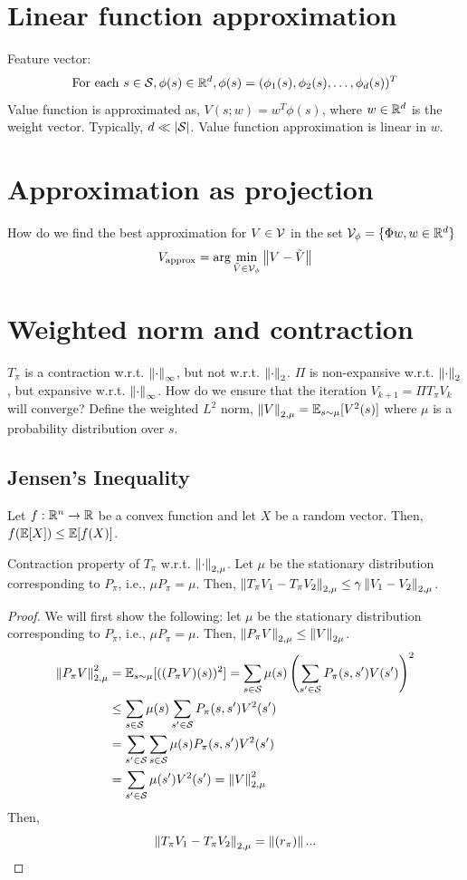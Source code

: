 \documentclass[11pt]{book}
\begin{document}
\section{Linear function approximation}
Feature vector: 
\[
  \text{For each } s \in\mathcal{S}, \phi(s) \in \mathbb{R}^d, \phi(s) = (\phi_1(s), \phi_2(s), \dots, \phi_d(s))^T 
\]
Value function is approximated as, $V(s; w) = w^T \phi(s)$, where $w \in \mathbb{R}^d$ is the weight vector. Typically, $d \ll |\mathcal{S}|$. Value function approximation is linear in $w$.

\section{Approximation as projection}
How do we find the best approximation for $V \in \mathcal{V}$ in the set $\mathcal{V}_\phi = \{\Phi w, w \in \mathbb{R}^d \}$
\[
  V_{\text{approx}} = \arg\min_{\tilde{V}\in\mathcal{V}_\phi} \left\lVert V - \tilde{V} \right\rVert
\] 
\section{Weighted norm and contraction}
$T_\pi$ is a contraction w.r.t. $\left\lVert \cdot \right\rVert_\infty$, but not w.r.t. $\left\lVert \cdot \right\rVert_2$. $\Pi$ is non-expansive w.r.t. $\left\lVert \cdot \right\rVert_2$, but expansive w.r.t. $\left\lVert \cdot \right\rVert_\infty$.
How do we ensure that the iteration $V_{k+1} = \Pi T_\pi V_k$ will converge? Define the weighted $L^2$ norm, $\left\lVert V \right\rVert_{2,\mu} = \mathbb{E}_{s\sim\mu}[V^2(s)]$ where $\mu$ is a probability distribution over $s$.

\subsection{Jensen's Inequality}
Let $f : \mathbb{R}^n \to \mathbb{R}$ be a convex function and let $X$ be a random vector. Then, $f(\mathbb{E}[X]) \leq \mathbb{E}[f(X)]$.

\begin{lemma}
  Contraction property of $T_\pi$ w.r.t. $\left\lVert \cdot \right\rVert_{2,\mu}$. Let $\mu$ be the stationary distribution corresponding to $P_\pi$, i.e., $\mu P_\pi = \mu$. Then, 
  $\left\lVert T_\pi V_1 - T_\pi V_2 \right\rVert_{2, \mu} \leq \gamma \left\lVert V_1 - V_2 \right\rVert_{2, \mu}$.
\end{lemma}

\begin{proof}
  We will first show the following: let $\mu$ be the stationary distribution corresponding to $P_\pi$, i.e., $\mu P_\pi = \mu$. Then, $\left\lVert P_\pi V \right\rVert_{2,\mu} \leq \left\lVert V \right\rVert_{2\mu}$.
  \begin{align*}
    \left\lVert P_\pi V \right\rVert_{2, \mu}^2 &= \mathbb{E}_{s\sim \mu} [((P_\pi V)(s))^2] = \sum_{s \in \mathcal{S}} \mu(s) \left( \sum_{s'\in\mathcal{S}} P_\pi(s,s')V(s') \right)^2 \\ 
    &\leq \sum_{s\in\mathcal{S}} \mu(s) \sum_{s'\in\mathcal{S}} P_\pi(s,s')V^2(s') \\ 
    &= \sum_{s'\in\mathcal{S}}\sum_{s\in\mathcal{S}} \mu(s) P_\pi(s,s') V^2(s') \\ 
    &= \sum_{s'\in\mathcal{S}} \mu(s')V^2(s') = \left\lVert V \right\rVert_{2,\mu}^2
  \end{align*}
  Then,
  \begin{align*}
    \left\lVert T_\pi V_1 - T_\pi V_2 \right\rVert_{2,\mu} = \left\lVert (r_\pi) \right\rVert ...
  \end{align*}
\end{proof}
\end{document}
